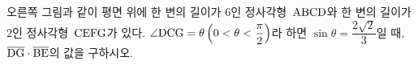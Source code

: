 \noindent\begin{minipage}[t]{0.58\linewidth}\vspace{0pt}\raggedright 오른쪽 그림과 같이 평면 위에 한 변의 길이가 $6$인 정사각형~$\mathrm{ABCD}$와 한 변의 길이가 $2$인 정사각형~$\mathrm{CEFG}$가 있다. $\angle\mathrm{DCG}=\theta\left(0<\theta<\dfrac{\pi}{2}\right)$라 하면 $\sin\theta=\dfrac{2\sqrt{2}}{3}$일 때, $\overline{\mathrm{DG}}\cdot\overline{\mathrm{BE}}$의 값을 구하시오.\end{minipage}\hfill\begin{minipage}[t]{0.4\linewidth}\vspace{0pt}\centering \resizebox{\ifdim\width>\linewidth\linewidth\else\width\fi}{!}{}\end{minipage}\par
